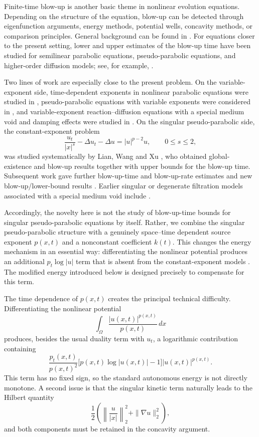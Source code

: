 \documentclass[12pt,reqno]{amsart}
\theoremstyle{definition}
\theoremstyle{remark}
\numberwithin{equation}{section}
\begin{document}
Finite-time blow-up is another basic theme in nonlinear evolution equations. Depending on the structure of the equation, blow-up can be detected through eigenfunction arguments, energy methods, potential wells, concavity methods, or comparison principles. General background can be found in \cite{Hu,GV,Lev}. For equations closer to the present setting, lower and upper estimates of the blow-up time have been studied for semilinear parabolic equations, pseudo-parabolic equations, and higher-order diffusion models; see, for example, \cite{BGH,SLW,TTDa,TTDb}.

Two lines of work are especially close to the present problem. On the variable-exponent side, time-dependent exponents in nonlinear parabolic equations were studied in \cite{GG}, pseudo-parabolic equations with variable exponents were considered in \cite{DSP}, and variable-exponent reaction--diffusion equations with a special medium void and damping effects were studied in \cite{Do}. On the singular pseudo-parabolic side, the constant-exponent problem
\[
\frac{u_t}{|x|^s}-\Delta u_t-\Delta u=|u|^{p-2}u,
\qquad 0\le s\le2,
\]
was studied systematically by Lian, Wang and Xu \cite{LWX}, who obtained global-existence and blow-up results together with upper bounds for the blow-up time. Subsequent work gave further blow-up-time and blow-up-rate estimates \cite{SHO} and new blow-up/lower-bound results \cite{YPC}. Earlier singular or degenerate filtration models associated with a special medium void include \cite{Tan,Han,Han2}.

Accordingly, the novelty here is not the study of blow-up-time bounds for singular pseudo-parabolic equations by itself. Rather, we combine the singular pseudo-parabolic structure with a genuinely space--time dependent source exponent $p(x,t)$ and a nonconstant coefficient $k(t)$. This changes the energy mechanism in an essential way: differentiating the nonlinear potential produces an additional $p_t\log|u|$ term that is absent from the constant-exponent models \cite{LWX,SHO,YPC}. The modified energy introduced below is designed precisely to compensate for this term.

The time dependence of $p(x,t)$ creates the principal technical difficulty. Differentiating the nonlinear potential
\[
\int_\Omega \frac{|u(x,t)|^{p(x,t)}}{p(x,t)}\,dx
\]
produces, besides the usual duality term with $u_t$, a logarithmic contribution containing
\[
\frac{p_t(x,t)}{p(x,t)^2}
\bigl[p(x,t)\log |u(x,t)|-1\bigr]|u(x,t)|^{p(x,t)}.
\]
This term has no fixed sign, so the standard autonomous energy is not directly monotone. A second issue is that the singular kinetic term naturally leads to the Hilbert quantity
\[
\frac12\left(\left\|\frac{u}{|x|}\right\|_2^2+\|\nabla u\|_2^2\right),
\]
and both components must be retained in the concavity argument.
\end{document}
